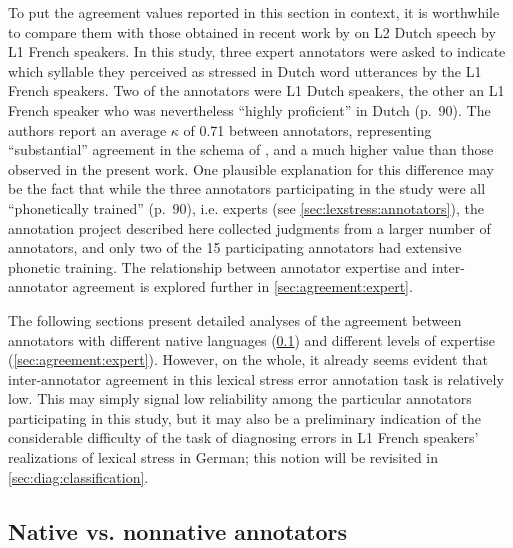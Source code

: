		
	To put the agreement values reported in this section in context, it is worthwhile to compare them with those obtained in recent work by \textcite{Michaux2013} on L2 Dutch speech by L1 French speakers. In this study, three expert annotators were asked to indicate which
	 syllable they perceived as stressed in Dutch word utterances by the L1 French speakers. Two of the annotators were L1 Dutch speakers, the other an L1 French speaker who was nevertheless ``highly proficient'' in Dutch (p.~90). The authors report an average $\kappa$ of 0.71 between annotators, representing ``substantial'' agreement in the schema of \textcite{Landis1977}, and a much higher value than those observed in the present work. One plausible explanation for this difference may be the fact that while the three annotators participating in the \textcite{Michaux2013} study were all ``phonetically trained'' (p.~90), i.e. experts (see \cref{sec:lexstress:annotators}),
	the annotation project described here collected judgments from a larger number of annotators, and only two of the 15 participating annotators had extensive phonetic training. The relationship between annotator expertise and inter-annotator agreement is explored further in \cref{sec:agreement:expert}. 
		
			The following sections present detailed analyses of the agreement between annotators with different native languages (\cref{sec:agreement:native}) and different levels of expertise (\cref{sec:agreement:expert}).  However, on the whole, it already seems evident that inter-annotator agreement in this lexical stress error annotation task is relatively low. This may simply signal low reliability among the particular annotators participating in this study, but it may also be a preliminary indication of the considerable difficulty of the task of diagnosing errors in L1 French speakers' realizations of lexical stress in German; this notion will be revisited in \cref{sec:diag:classification}. 

	
	
		\subsection{Native vs. nonnative annotators}
		\label{sec:agreement:native}


